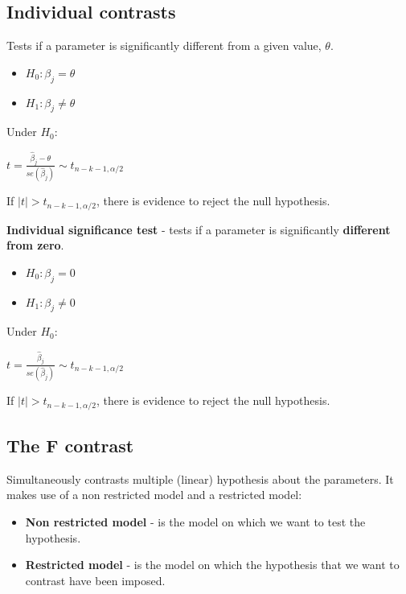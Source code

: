\documentclass[10pt, a4paper, landscape]{extarticle}
\begin{document}
\begin{multicols}{3}
\subsection*{Individual contrasts}

Tests if a parameter is significantly different from a given value, $\theta$.

\begin{itemize}[leftmargin=*]
\item $H_0: \beta_j = \theta$
\item $H_1: \beta_j \neq \theta$
\end{itemize}

Under $H_0$:

\begin{center}
$t = \frac{\hat{\beta}_j - \theta}{se(\hat{\beta}_j)} \sim t_{n-k-1, \alpha/2}$
\end{center}

If $\mid t \mid > t_{n-k-1, \alpha/2}$, there is evidence to reject the null hypothesis.

\textbf{Individual significance test} - tests if a parameter is significantly \textbf{different from zero}.

\begin{itemize}[leftmargin=*]
\item $H_0: \beta_j = 0$
\item $H_1: \beta_j \neq 0$
\end{itemize}

Under $H_0$:

\begin{center}
$t = \frac{\hat{\beta}_j}{se(\hat{\beta}_j)} \sim t_{n-k-1, \alpha/2}$
\end{center}

If $\mid t \mid > t_{n-k-1, \alpha/2}$, there is evidence to reject the null hypothesis.

\subsection*{The F contrast}

Simultaneously contrasts multiple (linear) hypothesis about the parameters. It makes use of a non restricted model and a restricted model:

\begin{itemize}[leftmargin=*]
\item \textbf{Non restricted model} - is the model on which we want to test the hypothesis.
\item \textbf{Restricted model} - is the model on which the hypothesis that we want to contrast have been imposed.
\end{itemize}


\end{multicols}
\end{document}
